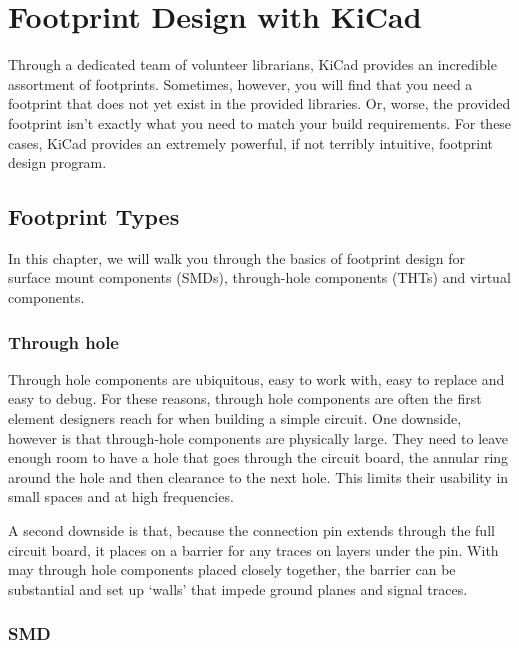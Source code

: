
\chapter{Footprint Design with KiCad}

Through a dedicated team of volunteer librarians, KiCad provides an incredible assortment of footprints.
Sometimes, however, you will find that you need a footprint that does not yet exist in the provided libraries.
Or, worse, the provided footprint isn't exactly what you need to match your build requirements.
For these cases, KiCad provides an extremely powerful, if not terribly intuitive, footprint design program.

\section{Footprint Types}
In this chapter, we will walk you through the basics of footprint design for surface mount components (SMDs), through-hole components (THTs) and virtual components.

\subsection{Through hole}

Through hole components are ubiquitous, easy to work with, easy to replace and easy to debug.  
For these reasons, through hole components are often the first element designers reach for when building a simple circuit.  
One downside, however is that through-hole components are physically large.  
They need to leave enough room to have a hole that goes through the circuit board, the annular ring around the hole and then clearance to the next hole.
This limits their usability in small spaces and at high frequencies.

A second downside is that, because the connection pin extends through the full circuit board, it places on a barrier for any traces on layers under the pin.  
With may through hole components placed closely together, the barrier can be substantial and set up `walls' that impede ground planes and signal traces.

\subsection{SMD}

